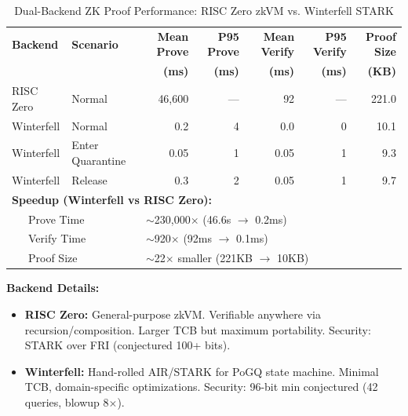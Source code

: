 
\begin{table}[ht]
\centering
\caption{Dual-Backend ZK Proof Performance: RISC Zero zkVM vs. Winterfell STARK}
\label{tab:dual-backend-comparison}
\begin{tabular}{llrrrrr}
\toprule
\textbf{Backend} & \textbf{Scenario} & \textbf{Mean Prove} & \textbf{P95 Prove} & \textbf{Mean Verify} & \textbf{P95 Verify} & \textbf{Proof Size} \\
 & & \textbf{(ms)} & \textbf{(ms)} & \textbf{(ms)} & \textbf{(ms)} & \textbf{(KB)} \\
\midrule
RISC Zero & Normal & 46,600 & --- & 92 & --- & 221.0 \\
\midrule
Winterfell & Normal & 0.2 & 4 & 0.0 & 0 & 10.1 \\
Winterfell & Enter Quarantine & 0.05 & 1 & 0.05 & 1 & 9.3 \\
Winterfell & Release & 0.3 & 2 & 0.05 & 1 & 9.7 \\
\midrule
\multicolumn{7}{l}{\textbf{Speedup (Winterfell vs RISC Zero):}} \\
\multicolumn{2}{l}{~~~Prove Time} & \multicolumn{5}{l}{$\sim$230,000$\times$ (46.6s $\rightarrow$ 0.2ms)} \\
\multicolumn{2}{l}{~~~Verify Time} & \multicolumn{5}{l}{$\sim$920$\times$ (92ms $\rightarrow$ 0.1ms)} \\
\multicolumn{2}{l}{~~~Proof Size} & \multicolumn{5}{l}{$\sim$22$\times$ smaller (221KB $\rightarrow$ 10KB)} \\
\bottomrule
\end{tabular}
\begin{tablenotes}
\small
\item \textbf{Backend Details:}
\begin{itemize}[leftmargin=*,nosep]
  \item \textbf{RISC Zero:} General-purpose zkVM. Verifiable anywhere via recursion/composition. Larger TCB but maximum portability. Security: STARK over FRI (conjectured 100+ bits).
  \item \textbf{Winterfell:} Hand-rolled AIR/STARK for PoGQ state machine. Minimal TCB, domain-specific optimizations. Security: 96-bit min conjectured (42 queries, blowup 8$\times$).
\end{itemize}


\end{tablenotes}
\end{table}
